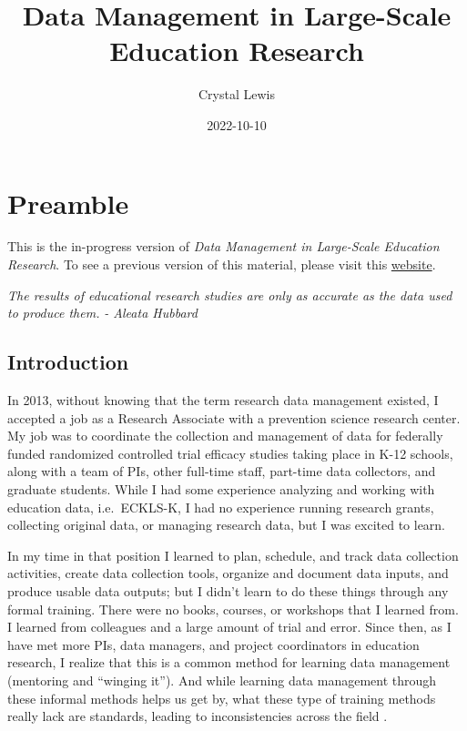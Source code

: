 \documentclass[
]{book}
\title{Data Management in Large-Scale Education Research}
\author{Crystal Lewis}
\date{2022-10-10}
\begin{document}
\maketitle

{
\setcounter{tocdepth}{1}
\tableofcontents
}
\hypertarget{preamble}{%
\chapter{Preamble}\label{preamble}}

This is the in-progress version of \emph{Data Management in Large-Scale Education Research}. To see a previous version of this material, please visit this \href{https://cghlewis.github.io/mpsi-data-training/}{website}.

\emph{The results of educational research studies are only as accurate as the data used to produce them.}
\emph{- Aleata Hubbard} \autocite{hubbard_data_2017}

\hypertarget{introduction}{%
\section{Introduction}\label{introduction}}

In 2013, without knowing that the term research data management existed, I accepted a job as a Research Associate with a prevention science research center. My job was to coordinate the collection and management of data for federally funded randomized controlled trial efficacy studies taking place in K-12 schools, along with a team of PIs, other full-time staff, part-time data collectors, and graduate students. While I had some experience analyzing and working with education data, i.e.~ECKLS-K, I had no experience running research grants, collecting original data, or managing research data, but I was excited to learn.

In my time in that position I learned to plan, schedule, and track data collection activities, create data collection tools, organize and document data inputs, and produce usable data outputs; but I didn't learn to do these things through any formal training. There were no books, courses, or workshops that I learned from. I learned from colleagues and a large amount of trial and error. Since then, as I have met more PIs, data managers, and project coordinators in education research, I realize that this is a common method for learning data management (mentoring and ``winging it''). And while learning data management through these informal methods helps us get by, what these type of training methods really lack are standards, leading to inconsistencies across the field \autocite{borghi_promoting_2022}.
\end{document}
